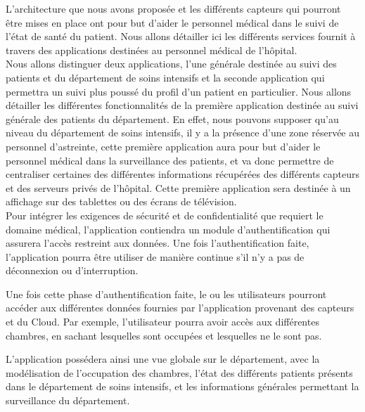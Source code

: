 L’architecture que nous avons proposée et les différents capteurs qui pourront être mises en place ont pour but d’aider le personnel médical dans le suivi de l’état de santé du patient. Nous allons détailler ici les différents services fournit à travers des applications destinées au personnel médical de l’hôpital.
\\

Nous allons distinguer deux applications, l’une générale destinée au suivi des patients et du département de soins intensifs et la seconde application qui permettra un suivi plus poussé du profil d’un patient en particulier. Nous allons détailler les différentes fonctionnalités de la première application destinée au suivi générale des patients du département. En effet, nous pouvons supposer qu’au niveau du département de soins intensifs, il y a la présence d’une zone réservée au personnel d’astreinte, cette première application aura pour but d’aider le personnel médical dans la surveillance des patients, et va donc permettre de centraliser certaines des différentes informations récupérées des différents capteurs et des serveurs privés de l’hôpital. Cette première application sera destinée à un affichage sur des tablettes ou des écrans de télévision. 
\\

Pour intégrer les exigences de sécurité et de confidentialité que requiert le domaine médical, l’application contiendra un module d’authentification qui assurera l’accès restreint aux données. Une fois l’authentification faite, l’application pourra être utiliser de manière continue s’il n’y a pas de déconnexion ou d’interruption.


Une fois cette phase d’authentification faite, le ou les utilisateurs pourront accéder aux différentes données fournies par l’application provenant des capteurs et du Cloud. Par exemple, l’utilisateur pourra avoir accès aux différentes chambres, en sachant lesquelles sont occupées et lesquelles ne le sont pas.


L’application possédera ainsi une vue globale sur le département, avec la modélisation de l’occupation des chambres, l’état des différents patients présents dans le département de soins intensifs, et les informations générales permettant la surveillance du département.

